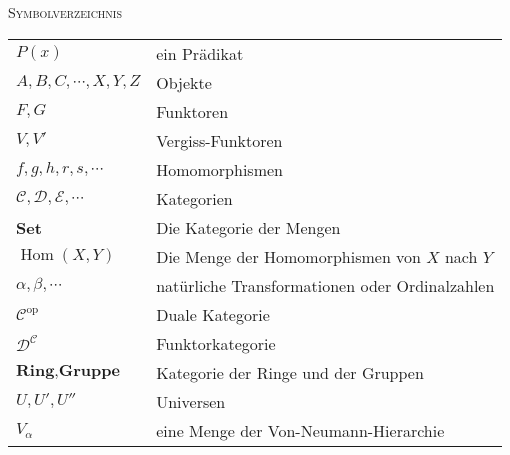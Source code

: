 \documentclass[a4paper]{amsart}
\theoremstyle{definition}
\DeclareMathOperator{\Hom}{Hom}
\newcommand{\CC}{\ensuremath{\mathcal{ C }}}
\newcommand{\DD}{\ensuremath{\mathcal{ D }}}
\begin{document}
\begin{large}
    \centerline{\textsc{Symbolverzeichnis}}
\end{large}
\bigskip

\renewcommand*{\arraystretch}{1}

\begin{tabular}{ll}
    $P(x)$                              & ein Prädikat\\
    $A, B, C, \cdots, X, Y, Z$          & Objekte\\
    $F,G$                               & Funktoren\\
    $V, V'$                             & Vergiss-Funktoren\\
    $f, g, h, r, s, \cdots$             & Homomorphismen\\
    $\mathcal C, \mathcal D, \mathcal E, \cdots$ & Kategorien\\
    \textbf{Set}                        & Die Kategorie der Mengen\\
    $\Hom( X, Y)$                       & Die Menge der Homomorphismen von $X$ nach $Y$\\
    $\alpha, \beta, \cdots$             & natürliche Transformationen oder Ordinalzahlen\\
    $\mathcal C ^{\text{op}}$           & Duale Kategorie\\
    $\DD^\CC$                           & Funktorkategorie\\
    $\textbf{Ring}, \textbf{Gruppe}$    & Kategorie der Ringe und der Gruppen\\
    $U, U', U''$                        & Universen\\
    $V_\alpha$                          & eine Menge der Von-Neumann-Hierarchie

\end{tabular}
\end{document}
